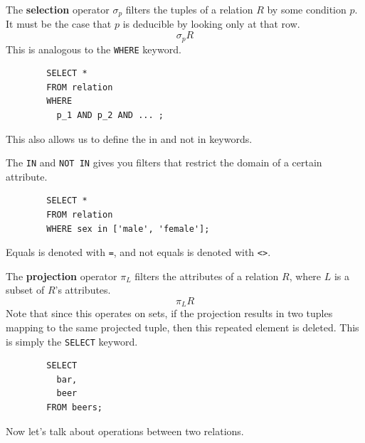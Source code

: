 \documentclass{article}
\begin{document}
    \begin{definition}[Selection]
      The \textbf{selection} operator $\sigma_p$ filters the tuples of a relation $R$ by some condition $p$. It must be the case that $p$ is deducible by looking only at that row. 
      \begin{equation}
        \sigma_p R
      \end{equation}
      This is analogous to the \texttt{WHERE} keyword. 
      \begin{lstlisting}
        SELECT * 
        FROM relation 
        WHERE 
          p_1 AND p_2 AND ... ; 
      \end{lstlisting}
    \end{definition}

    This also allows us to define the in and not in keywords. 

    \begin{definition}
      The \texttt{IN} and \texttt{NOT IN} gives you filters that restrict the domain of a certain attribute. 
      \begin{lstlisting}
        SELECT * 
        FROM relation 
        WHERE sex in ['male', 'female']; 
      \end{lstlisting}
      Equals is denoted with \texttt{=}, and not equals is denoted with \texttt{<>}. 
    \end{definition}

    \begin{definition}[Projection]
      The \textbf{projection} operator $\pi_L$ filters the attributes of a relation $R$, where $L$ is a subset of $R$'s attributes. 
      \begin{equation}
        \pi_L R
      \end{equation}
      Note that since this operates on sets, if the projection results in two tuples mapping to the same projected tuple, then this repeated element is deleted. This is simply the \texttt{SELECT} keyword. 
      \begin{lstlisting}
        SELECT 
          bar,
          beer
        FROM beers; 
      \end{lstlisting}
    \end{definition}

    Now let's talk about operations between two relations. 
\end{document}
